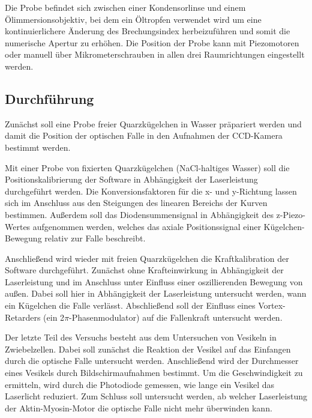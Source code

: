 Die Probe befindet sich zwischen einer Kondensorlinse und einem Ölimmersionsobjektiv, bei dem ein 
Öltropfen verwendet wird um eine kontinuierlichere Änderung des Brechungsindex herbeizuführen und somit die numerische Apertur zu erhöhen.
Die Position der Probe kann mit Piezomotoren oder manuell über Mikrometerschrauben in allen drei Raumrichtungen eingestellt werden.

\subsection{Durchführung}
Zunächst soll eine Probe freier Quarzkügelchen in Wasser präpariert werden
und damit die Position der optischen Falle in den Aufnahmen der CCD-Kamera
bestimmt werden.

Mit einer Probe von fixierten Quarzkügelchen (NaCl-haltiges Wasser)
soll die Positionskalibrierung der Software in Abhängigkeit der 
Laserleistung durchgeführt werden. Die Konversionsfaktoren für die x- und y-Richtung lassen 
sich im Anschluss aus den Steigungen des linearen Bereichs der Kurven bestimmen. Außerdem soll das Diodensummensignal in Abhängigkeit des z-Piezo-Wertes 
aufgenommen werden, welches das axiale Positionssignal einer Kügelchen-Bewegung relativ zur Falle beschreibt.

Anschließend wird wieder mit freien Quarzkügelchen die Kraftkalibration der Software durchgeführt.
Zunächst ohne Krafteinwirkung in Abhängigkeit der Laserleistung und im Anschluss unter Einfluss einer oszillierenden Bewegung von außen.
Dabei soll hier in Abhängigkeit der Laserleistung untersucht werden, wann ein Kügelchen die Falle verlässt.
Abschließend soll der Einfluss eines Vortex-Retarders (ein 2$\pi$-Phasenmodulator) auf die Fallenkraft untersucht werden.

Der letzte Teil des Versuchs besteht aus dem Untersuchen von Vesikeln in Zwiebelzellen.
Dabei soll zunächst die Reaktion der Vesikel auf das Einfangen durch die optische Falle untersucht werden.
Anschließend wird der Durchmesser eines Vesikels durch Bildschirmaufnahmen bestimmt. 
Um die Geschwindigkeit zu ermitteln, wird durch die Photodiode gemessen, wie lange ein Vesikel das Laserlicht reduziert.
Zum Schluss soll untersucht werden, ab welcher Laserleistung der Aktin-Myosin-Motor die optische Falle nicht mehr überwinden kann.